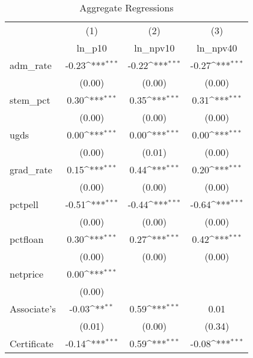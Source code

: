 \begin{table}[htbp]\centering
\def\sym#1{\ifmmode^{#1}\else\(^{#1}\)\fi}
\caption{Aggregate Regressions}
\begin{tabular}{l*{3}{c}}
\toprule
                    &\multicolumn{1}{c}{(1)}&\multicolumn{1}{c}{(2)}&\multicolumn{1}{c}{(3)}\\
                    &\multicolumn{1}{c}{ln\_p10}&\multicolumn{1}{c}{ln\_npv10}&\multicolumn{1}{c}{ln\_npv40}\\
\midrule
adm\_rate            &       -0.23\sym{***}&       -0.22\sym{***}&       -0.27\sym{***}\\
                    &      (0.00)         &      (0.00)         &      (0.00)         \\
stem\_pct            &        0.30\sym{***}&        0.35\sym{***}&        0.31\sym{***}\\
                    &      (0.00)         &      (0.00)         &      (0.00)         \\
ugds                &        0.00\sym{***}&        0.00\sym{***}&        0.00\sym{***}\\
                    &      (0.00)         &      (0.01)         &      (0.00)         \\
grad\_rate           &        0.15\sym{***}&        0.44\sym{***}&        0.20\sym{***}\\
                    &      (0.00)         &      (0.00)         &      (0.00)         \\
pctpell             &       -0.51\sym{***}&       -0.44\sym{***}&       -0.64\sym{***}\\
                    &      (0.00)         &      (0.00)         &      (0.00)         \\
pctfloan            &        0.30\sym{***}&        0.27\sym{***}&        0.42\sym{***}\\
                    &      (0.00)         &      (0.00)         &      (0.00)         \\
netprice            &        0.00\sym{***}&                     &                     \\
                    &      (0.00)         &                     &                     \\
Associate's         &       -0.03\sym{**} &        0.59\sym{***}&        0.01         \\
                    &      (0.01)         &      (0.00)         &      (0.34)         \\
Certificate         &       -0.14\sym{***}&        0.59\sym{***}&       -0.08\sym{***}\\

\end{tabular}
\end{table}

